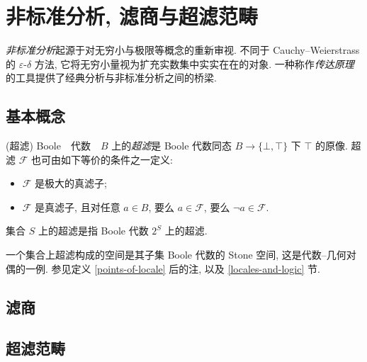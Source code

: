 \section{非标准分析, 滤商与超滤范畴}

\emph{非标准分析}起源于对无穷小与极限等概念的重新审视. 不同于 Cauchy--Weierstrass 的 $\varepsilon$-$\delta$ 方法, 它将无穷小量视为扩充实数集中实实在在的对象. 一种称作\emph{传达原理}的工具提供了经典分析与非标准分析之间的桥梁.

\subsection{基本概念}

\begin{definition}
	{(超滤)}
	Boole　代数　$B$ 上的\emph{超滤}是 Boole 代数同态 $B\to \{\bot,\top\}$ 下 $\top$ 的原像. 超滤 $\mathcal F$ 也可由如下等价的条件之一定义:
	\begin{itemize}
		\item $\mathcal F$ 是极大的真滤子;
		\item $\mathcal F$ 是真滤子, 且对任意 $a\in B$, 要么 $a\in\mathcal F$, 要么 $\neg a\in \mathcal F$.
	\end{itemize}
	集合 $S$ 上的超滤是指 Boole 代数 $2^S$ 上的超滤.
\end{definition}

\begin{remark}
	{}
	一个集合上超滤构成的空间是其子集 Boole 代数的 Stone 空间, 这是代数--几何对偶的一例. 参见定义 \ref{points-of-locale} 后的注, 以及 \ref{locales-and-logic} 节.
\end{remark}

\subsection{滤商}

\subsection{超滤范畴}